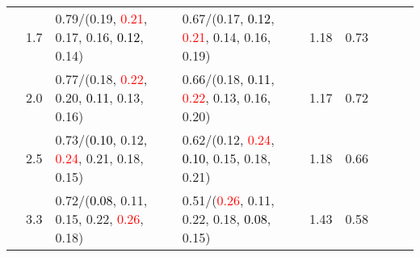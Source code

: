 \documentclass[10pt,a4paper]{report}
\begin{document}
\begin{table}[!htbp]
\begin{center}
{\begin{tabular}{ccllccccc}
				  & 1.7                               & 0.79/(0.19, \textcolor{red}{0.21}, 0.17, 0.16, \textcolor{black}{0.12}, 0.14)                                                                   & 0.67/(0.17, \textcolor{black}{0.12}, \textcolor{red}{0.21}, 0.14, 0.16, 0.19)                                                                   & 1.18             & 0.73                     \\
				  & 2.0                               & 0.77/(0.18, \textcolor{red}{0.22}, 0.20, \textcolor{black}{0.11}, 0.13, 0.16)                                                                   & 0.66/(0.18, \textcolor{black}{0.11}, \textcolor{red}{0.22}, 0.13, 0.16, 0.20)                                                                   & 1.17             & 0.72                     \\
				  & 2.5                               & 0.73/(\textcolor{black}{0.10}, 0.12, \textcolor{red}{0.24}, 0.21, 0.18, 0.15)                                                                   & 0.62/(0.12, \textcolor{red}{0.24}, \textcolor{black}{0.10}, 0.15, 0.18, 0.21)                                                                   & 1.18             & 0.66                     \\
				  & 3.3                               & 0.72/(\textcolor{black}{0.08}, 0.11, 0.15, 0.22, \textcolor{red}{0.26}, 0.18)                                                                   & 0.51/(\textcolor{red}{0.26}, 0.11, 0.22, 0.18, \textcolor{black}{0.08}, 0.15)                                                                   & 1.43             & 0.58                     \\
				\bottomrule
			\end{tabular}}
	\end{center}
\end{table}
\end{document}
